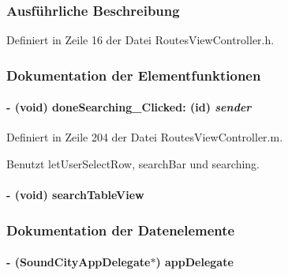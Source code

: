 \subsubsection{Ausführliche Beschreibung}


Definiert in Zeile 16 der Datei RoutesViewController.h.

\subsubsection{Dokumentation der Elementfunktionen}
\hypertarget{interface_routes_view_controller_a3f068c95509fa343272cdbc12b20148e}{
\paragraph[{doneSearching\_\-Clicked:}]{\setlength{\rightskip}{0pt plus 5cm}-\/ (void) doneSearching\_\-Clicked: (id) {\em sender}}\hfill}
\label{interface_routes_view_controller_a3f068c95509fa343272cdbc12b20148e}


Definiert in Zeile 204 der Datei RoutesViewController.m.

Benutzt letUserSelectRow, searchBar und searching.\hypertarget{interface_routes_view_controller_a2350a9b37e0e6ae0fd8023816c089b23}{
\paragraph[{searchTableView}]{\setlength{\rightskip}{0pt plus 5cm}-\/ (void) searchTableView }\hfill}
\label{interface_routes_view_controller_a2350a9b37e0e6ae0fd8023816c089b23}


\subsubsection{Dokumentation der Datenelemente}
\hypertarget{interface_routes_view_controller_ab71ce4b8a535bca29bb855d0613b875a}{
\paragraph[{appDelegate}]{\setlength{\rightskip}{0pt plus 5cm}-\/ ({\bf SoundCityAppDelegate}$\ast$) {\bf appDelegate}}\hfill}
\label{interface_routes_view_controller_ab71ce4b8a535bca29bb855d0613b875a}


